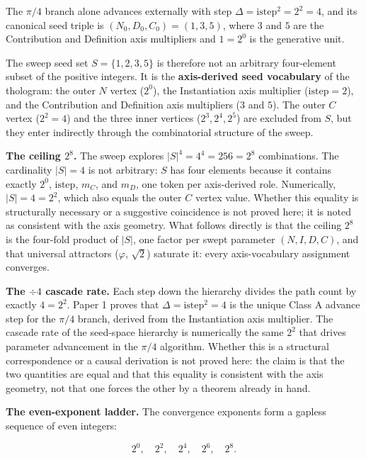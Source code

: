 \documentclass[
  11pt,
  letterpaper,
]{article}
\begin{document}
The \(\pi/4\) branch alone advances externally with step
\(\Delta = \mathrm{istep}^2 = 2^2 = 4\), and its canonical seed triple
is \((N_0, D_0, C_0) = (1, 3, 5)\), where \(3\) and \(5\) are the
Contribution and Definition axis multipliers and \(1 = 2^0\) is the
generative unit.

The sweep seed set \(S = \{1, 2, 3, 5\}\) is therefore not an arbitrary
four-element subset of the positive integers. It is the
\textbf{axis-derived seed vocabulary} of the thologram: the outer \(N\)
vertex (\(2^0\)), the Instantiation axis multiplier
(\(\mathrm{istep} = 2\)), and the Contribution and Definition axis
multipliers (\(3\) and \(5\)). The outer \(C\) vertex (\(2^2 = 4\)) and
the three inner vertices (\(2^3, 2^4, 2^5\)) are excluded from \(S\),
but they enter indirectly through the combinatorial structure of the
sweep.

\textbf{The ceiling \(2^8\).} The sweep explores
\(|S|^4 = 4^4 = 256 = 2^8\) combinations. The cardinality \(|S| = 4\) is
not arbitrary: \(S\) has four elements because it contains exactly
\(2^0\), \(\mathrm{istep}\), \(m_C\), and \(m_D\), one token per
axis-derived role. Numerically, \(|S| = 4 = 2^2\), which also equals the
outer \(C\) vertex value. Whether this equality is structurally
necessary or a suggestive coincidence is not proved here; it is noted as
consistent with the axis geometry. What follows directly is that the
ceiling \(2^8\) is the four-fold product of \(|S|\), one factor per
swept parameter \((N, I, D, C)\), and that universal attractors
(\(\varphi\), \(\sqrt{2}\)) saturate it: every axis-vocabulary
assignment converges.

\textbf{The \(\div 4\) cascade rate.} Each step down the hierarchy
divides the path count by exactly \(4 = 2^2\). Paper 1 proves that
\(\Delta = \mathrm{istep}^2 = 4\) is the unique Class A advance step for
the \(\pi/4\) branch, derived from the Instantiation axis multiplier.
The cascade rate of the seed-space hierarchy is numerically the same
\(2^2\) that drives parameter advancement in the \(\pi/4\) algorithm.
Whether this is a structural correspondence or a causal derivation is
not proved here: the claim is that the two quantities are equal and that
this equality is consistent with the axis geometry, not that one forces
the other by a theorem already in hand.

\textbf{The even-exponent ladder.} The convergence exponents form a
gapless sequence of even integers:

\[2^0, \quad 2^2, \quad 2^4, \quad 2^6, \quad 2^8.\]
\end{document}
